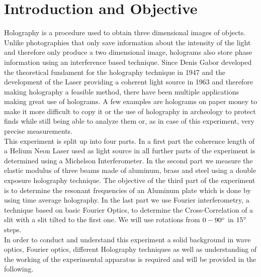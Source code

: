 \section{Introduction and Objective}

Holography is a procedure used to obtain three dimensional images of objects. Unlike photographies that only save information about the intensity of the light and therefore only produce a two dimensional image, holograms also store phase information using an interference based technique. 
Since Denis Gabor developed the theoretical fundament for the holography technique in 1947 and the development of the Laser providing a coherent light source in 1963 and therefore making holography a feasible method, there have been multiple applications making great use of holograms.
A few examples are holograms on paper money to make it more difficult to copy it or the use of holography in archeology to protect finds while still being able to analyze them or, as in case of this experiment, very precise measurements.\\
This experiment is split up into four parts. In a first part the coherence length of a Helium Neon Laser used as light source in all further parts of the experiment is determined using a Michelson Interferometer. In the second part we measure the elastic modulus of three beams made of aluminum, brass and steel using a double exposure holography technique. The objective of the third part of the experiment is to determine the resonant frequencies of an Aluminum plate which is done by using time average holography. In the last part we use Fourier interferometry, a technique based on basic Fourier Optics, to determine the Cross-Correlation of a slit with a slit tilted to the first one. We will use rotations from $0-90^\circ$ in $15^\circ
$ steps.\\
In order to conduct and understand this experiment a solid background in wave optics, Fourier optics, different Holography techniques as well as understanding of the working of the experimental apparatus is required and will be provided in the following.